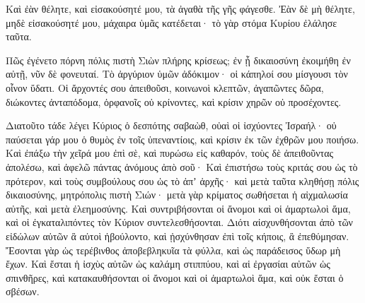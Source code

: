 {Καὶ ἐὰν θέλητε, καὶ εἰσακούσητέ μου, τὰ ἀγαθὰ τῆς γῆς φάγεσθε.
Ἐὰν δὲ μὴ θέλητε, μηδὲ εἰσακούσητέ μου, μάχαιρα ὑμᾶς κατέδεται· τὸ γὰρ στόμα Κυρίου ἐλάλησε ταῦτα.
\par }{\PP {}Πῶς ἐγένετο πόρνη πόλις πιστὴ Σιὼν πλήρης κρίσεως; ἐν ᾗ δικαιοσύνη ἐκοιμήθη ἐν αὐτῇ, νῦν δὲ φονευταί.
Τὸ ἀργύριον ὑμῶν ἀδόκιμον· οἱ κάπηλοί σου μίσγουσι τὸν οἶνον ὕδατι.
Οἱ ἄρχοντές σου ἀπειθοῦσι, κοινωνοὶ κλεπτῶν, ἀγαπῶντες δῶρα, διώκοντες ἀνταπόδομα, ὀρφανοῖς οὐ κρίνοντες, καὶ κρίσιν χηρῶν οὐ προσέχοντες.
\par }{\PP {}Διατοῦτο τάδε λέγει Κύριος ὁ δεσπότης σαβαὼθ, οὐαὶ οἱ ἰσχύοντες Ἰσραήλ· οὐ παύσεται γάρ μου ὁ θυμὸς ἐν τοῖς ὑπεναντίοις, καὶ κρίσιν ἐκ τῶν ἐχθρῶν μου ποιήσω.
Καὶ ἐπάξω τὴν χεῖρά μου ἐπὶ σὲ, καὶ πυρώσω εἰς καθαρόν, τοὺς δὲ ἀπειθοῦντας ἀπολέσω, καὶ ἀφελῶ πάντας ἀνόμους ἀπὸ σοῦ·
Καὶ ἐπιστήσω τοὺς κριτάς σου ὡς τὸ πρότερον, καὶ τοὺς συμβούλους σου ὡς τὸ ἀπʼ ἀρχῆς· καὶ μετὰ ταῦτα κληθήσῃ πόλις δικαιοσύνης, μητρόπολις πιστὴ Σιών·
μετὰ γὰρ κρίματος σωθήσεται ἡ αἰχμαλωσία αὐτῆς, καὶ μετὰ ἐλεημοσύνης.
Καὶ συντριβήσονται οἱ ἄνομοι καὶ οἱ ἁμαρτωλοὶ ἅμα, καὶ οἱ ἐγκαταλιπόντες τὸν Κύριον συντελεσθήσονται.
Διότι αἰσχυνθήσονται ἀπὸ τῶν εἰδώλων αὐτῶν ἃ αὐτοὶ ἠβούλοντο, καὶ ᾐσχύνθησαν ἐπὶ τοῖς κήποις, ἃ ἐπεθύμησαν.
Ἔσονται γὰρ ὡς τερέβινθος ἀποβεβληκυῖα τὰ φύλλα, καὶ ὡς παράδεισος ὕδωρ μὴ ἔχων.
Καὶ ἔσται ἡ ἰσχὺς αὐτῶν ὡς καλάμη στιππύου, καὶ αἱ ἐργασίαι αὐτῶν ὡς σπινθῆρες, καὶ κατακαυθήσονται οἱ ἄνομοι καὶ οἱ ἁμαρτωλοὶ ἅμα, καὶ οὐκ ἔσται ὁ σβέσων.

}
